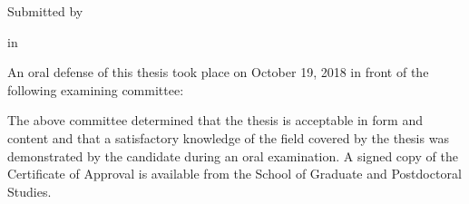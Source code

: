


\noindent
{\Large \ttitle} \newline
Submitted by \authorname \newline

\noindent
\degreename \hspace{0.07cm} in \subjectname

\vspace{1cm}

An oral defense of this thesis took place on October 19, 2018 in front of the following examining committee: 

      \begin{table}[h!]
      \centering
      \caption*{Examining Committee}
      \end{table}


The above committee determined that the thesis is acceptable in form and content and that a satisfactory knowledge of the field covered by the thesis was demonstrated by the candidate during an oral examination.  A signed copy of the Certificate of Approval is available from the School of Graduate and Postdoctoral Studies.

\cleardoublepage

